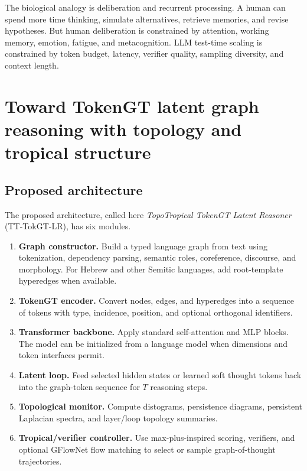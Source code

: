\documentclass[11pt]{article}
\newcommand{\1}{\mathbf{1}}
\begin{document}
The biological analogy is deliberation and recurrent processing. A human can spend more time thinking, simulate alternatives, retrieve memories, and revise hypotheses. But human deliberation is constrained by attention, working memory, emotion, fatigue, and metacognition. LLM test-time scaling is constrained by token budget, latency, verifier quality, sampling diversity, and context length.

\section{Toward TokenGT latent graph reasoning with topology and tropical structure}

\subsection{Proposed architecture}

The proposed architecture, called here \emph{TopoTropical TokenGT Latent Reasoner} (TT-TokGT-LR), has six modules.

\begin{enumerate}
\item \textbf{Graph constructor.} Build a typed language graph from text using tokenization, dependency parsing, semantic roles, coreference, discourse, and morphology. For Hebrew and other Semitic languages, add root-template hyperedges when available.
\item \textbf{TokenGT encoder.} Convert nodes, edges, and hyperedges into a sequence of tokens with type, incidence, position, and optional orthogonal identifiers.
\item \textbf{Transformer backbone.} Apply standard self-attention and MLP blocks. The model can be initialized from a language model when dimensions and token interfaces permit.
\item \textbf{Latent loop.} Feed selected hidden states or learned soft thought tokens back into the graph-token sequence for $T$ reasoning steps.
\item \textbf{Topological monitor.} Compute distograms, persistence diagrams, persistent Laplacian spectra, and layer/loop topology summaries.
\item \textbf{Tropical/verifier controller.} Use max-plus-inspired scoring, verifiers, and optional GFlowNet flow matching to select or sample graph-of-thought trajectories.
\end{enumerate}
\end{document}
